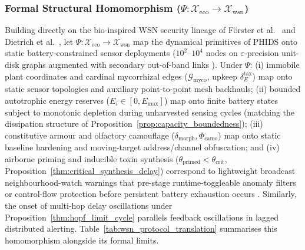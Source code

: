 \subsubsection{Formal Structural Homomorphism ($\Psi: \mathcal{X}_{\text{eco}} \to \mathcal{X}_{\text{wsn}}$)}
Building directly on the bio-inspired WSN security lineage of Förster et al.~\cite{forster2023novel, forster2024determining, forster2024topology} and Dietrich et al.~\cite{dietrich2025visual}, let $\Psi: \mathcal{X}_{\text{eco}} \to \mathcal{X}_{\text{wsn}}$ map the dynamical primitives of PHIDS onto static battery-constrained sensor deployments ($10^2\text{--}10^4$ nodes on $\varepsilon$-precision unit-disk graphs augmented with secondary out-of-band links \cite{forster2024topology}). Under $\Psi$: (i) immobile plant coordinates and cardinal mycorrhizal edges ($\mathcal{G}_{\text{myco}}$, upkeep $\delta_E^{\text{tax}}$) map onto static sensor topologies and auxiliary point-to-point mesh backhauls; (ii) bounded autotrophic energy reserves ($E_i \in [0, E_{\max}]$) map onto finite battery states subject to monotonic depletion during unharvested sensing cycles (matching the dissipation structure of Proposition~\ref{prop:capacity_boundedness}); (iii) constitutive armour and olfactory camouflage ($\delta_{\mathrm{morph}}, \Phi_{\mathrm{camo}}$) map onto static baseline hardening and moving-target address/channel obfuscation; and (iv) airborne priming and inducible toxin synthesis ($\theta_{\mathrm{primed}} < \theta_{\mathrm{crit}}$, Proposition~\ref{thm:critical_synthesis_delay}) correspond to lightweight broadcast neighbourhood-watch warnings that pre-stage runtime-toggleable anomaly filters or control-flow protection before persistent battery exhaustion occurs \cite{forster2024determining}. Similarly, the onset of multi-hop delay oscillations under Proposition~\ref{thm:hopf_limit_cycle} parallels feedback oscillations in lagged distributed alerting. Table~\ref{tab:wsn_protocol_translation} summarises this homomorphism alongside its formal limits.

